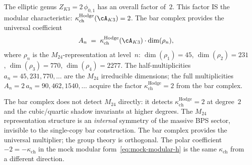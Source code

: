 \begin{remark}[The factor \texorpdfstring{$2$}{2} in \texorpdfstring{$Z_{K3} = 2\,\phi_{0,1}$}{Z-K3 = 2phi-0,1} is \texorpdfstring{$\kappa_{\mathrm{ch}}$}{kappa-ch}]
\label{rem:factor-2-is-kappa}
The elliptic genus $Z_{K3} = 2\,\phi_{0,1}$ has an overall
factor of~$2$. This factor IS the modular characteristic:
$\kappa_{\mathrm{ch}}^{\mathrm{Hodge}}(\cA_{K3}) = 2$. The bar complex provides the
universal coefficient
\begin{equation}\label{eq:moonshine-multiplier}
A_n \;=\; \kappa_{\mathrm{ch}}^{\mathrm{Hodge}}(\cA_{K3}) \cdot \dim(\rho_n),
\end{equation}
where $\rho_n$ is the $M_{24}$-representation at level~$n$:
$\dim(\rho_1) = 45$, $\dim(\rho_2) = 231$,
$\dim(\rho_3) = 770$, $\dim(\rho_4) = 2277$. The
half-multiplicities $a_n = 45, 231, 770, \ldots$ are the
$M_{24}$ irreducible dimensions; the full multiplicities
$A_n = 2\,a_n = 90, 462, 1540, \ldots$ acquire the factor
$\kappa_{\mathrm{ch}}^{\mathrm{Hodge}} = 2$ from the bar complex.

The bar complex does not detect $M_{24}$ directly: it
detects $\kappa_{\mathrm{ch}}^{\mathrm{Hodge}} = 2$ at degree~$2$ and the cubic/quartic
shadow invariants at higher degrees. The $M_{24}$
representation structure is an \emph{internal} symmetry of
the massive BPS sector, invisible to the single-copy bar
construction. The bar complex provides the universal
multiplier; the group theory is orthogonal. The polar
coefficient $-2 = -\kappa_{\mathrm{ch}}$ in the mock modular
form~\eqref{eq:mock-modular-h} is the same $\kappa_{\mathrm{ch}}$
from a different direction.
\end{remark}

